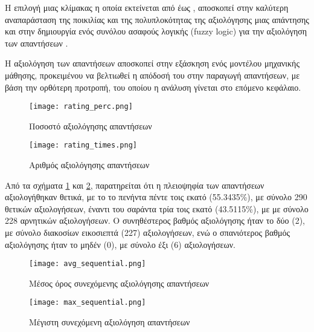   Η επιλογή μιας κλίμακας η οποία εκτείνεται από  έως
  , αποσκοπεί στην καλύτερη αναπαράσταση της ποικιλίας και
  της πολυπλοκότητας της αξιολόγησης μιας απάντησης και στην δημιουργία
  ενός συνόλου ασαφούς λογικής (\textlatin{fuzzy logic}) για την
  αξιολόγηση των απαντήσεων
  \cite{ZADEH1965338,klir1995fuzzy,ross2010fuzzy}.

  Η αξιολόγηση των απαντήσεων αποσκοπεί στην εξάσκηση ενός μοντέλου
  μηχανικής μάθησης, προκειμένου να βελτιωθεί η απόδοσή του στην παραγωγή
  απαντήσεων, με βάση την ορθότερη προτροπή, του οποίου η ανάλυση γίνεται
  στο επόμενο κεφάλαιο.

  \begin{figure}[H]
    \begin{center}
      \texttt{[image: rating\_perc.png]}
      \caption{Ποσοστό αξιολόγησης απαντήσεων}
    \end{center}
    \label{fig:RatingPerc}
  \end{figure}

  \begin{figure}[H]
    \begin{center}
      \texttt{[image: rating\_times.png]}
      \caption{Αριθμός αξιολόγησης απαντήσεων}
    \end{center}
    \label{fig:RatingTimes}
  \end{figure}

  Από τα σχήματα \ref{fig:RatingPerc} και \ref{fig:RatingTimes},
  παρατηρείται ότι η πλειοψηφία των απαντήσεων αξιολογήθηκαν θετικά, με το
  το πενήντα πέντε τοις εκατό (55.3435\%), με σύνολο 290 θετικών
  αξιολογήσεων, έναντι του σαράντα τρία τοις εκατό (43.5115\%), με με
  σύνολο 228 αρνητικών αξιολογήσεων. Ο συνηθέστερος βαθμός αξιολόγησης
  ήταν το δύο (2), με σύνολο διακοσίων εικοσιεπτά (227) αξιολογήσεων, ενώ
  ο σπανιότερος βαθμός αξιολόγησης ήταν το μηδέν (0), με σύνολο έξι (6)
  αξιολογήσεων.

  \begin{figure}[H]
    \begin{center}
      \texttt{[image: avg\_sequential.png]}
      \caption{Μέσος όρος συνεχόμενης αξιολόγησης απαντήσεων}
    \end{center}
    \label{fig:AverageSequential}
  \end{figure}

  \begin{figure}[H]
    \begin{center}
      \texttt{[image: max\_sequential.png]}
      \caption{Μέγιστη συνεχόμενη αξιολόγηση απαντήσεων}
    \end{center}
    \label{fig:MaxSequential}
  \end{figure}

